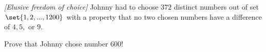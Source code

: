 \begin{problem}
\begin{figure}
\begin{center}
\captionsetup{singlelinecheck=off}
\captionsetup[subfigure]{singlelinecheck=on}
%
%
\end{center}
\end{figure}




\end{problem}
%

\begin{problem}
\textit{[Elusive freedom of choice]}
Johnny had to choose $372$ distinct numbers out of set $\set{1,2,...,1200}$ with a property that no two chosen numbers have a difference of $4,5,$ or $9$. 

Prove that Johnny chose number $600$! 
\end{problem}
%

